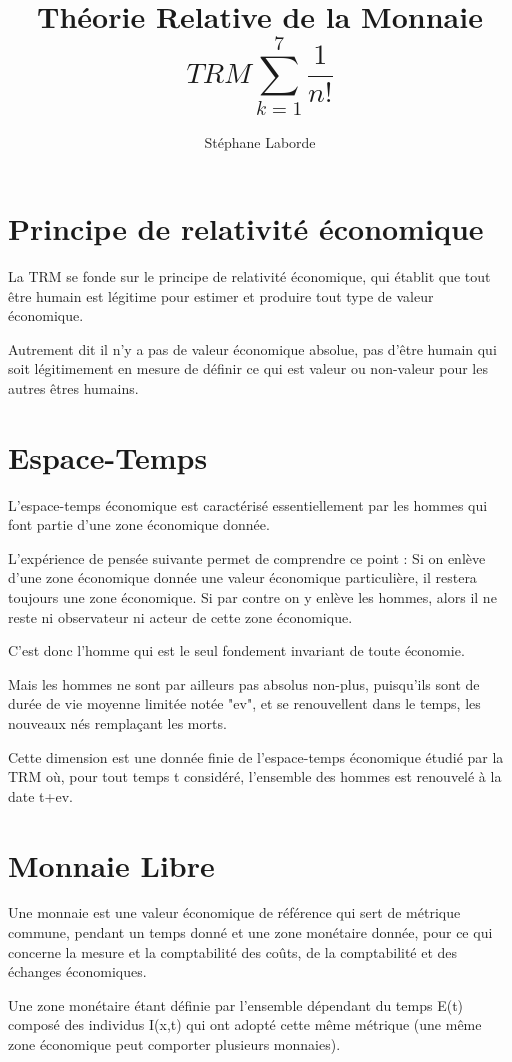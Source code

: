\documentclass[a4paper,oneside,12pt]{article}
\title{Théorie Relative de la Monnaie \\
\begin{displaymath}TRM \sum_{k=1}^{7}\frac{1}{n!}\end{displaymath}}
\author{Stéphane Laborde}
\begin{document}
\maketitle
\newpage
\tableofcontents
\newpage
\section{Principe de relativité économique}
La TRM se fonde sur le principe de relativité économique, qui établit que tout être humain est légitime pour estimer et produire tout type de valeur économique.

Autrement dit il n'y a pas de valeur économique absolue, pas d'être humain qui soit légitimement en mesure de définir ce qui est valeur ou non-valeur pour les autres êtres humains.
\section{Espace-Temps}
L'espace-temps économique est caractérisé essentiellement par les hommes qui font partie d'une zone économique donnée.

L'expérience de pensée suivante permet de comprendre ce point : Si on enlève d'une zone économique donnée une valeur économique particulière, il restera toujours une zone économique. Si par contre on y enlève les hommes, alors il ne reste ni observateur ni acteur de cette zone économique.

C'est donc l'homme qui est le seul fondement invariant de toute économie.

Mais les hommes ne sont par ailleurs pas absolus non-plus, puisqu'ils sont de durée de vie moyenne limitée notée "ev", et se renouvellent dans le temps, les nouveaux nés remplaçant les morts.

Cette dimension est une donnée finie de l'espace-temps économique étudié par la TRM où, pour tout temps t considéré, l'ensemble des hommes est renouvelé à la date t+ev.

\section{Monnaie Libre}

Une monnaie est une valeur économique de référence qui sert de métrique commune, pendant un temps donné et une zone monétaire donnée, pour ce qui concerne la mesure et la comptabilité des coûts, de la comptabilité et des échanges économiques.

Une zone monétaire étant définie par l'ensemble dépendant du temps E(t) composé des individus I(x,t) qui ont adopté cette même métrique (une même zone économique peut comporter plusieurs monnaies).
\end{document}
